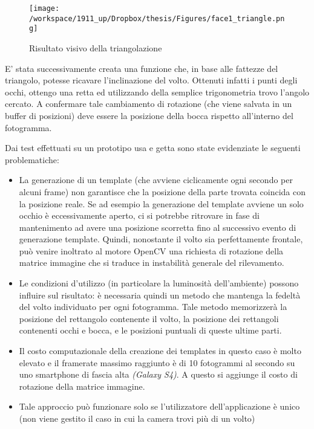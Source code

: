 \begin{figure}[H]\centering  
\texttt{[image: /workspace/1911\_up/Dropbox/thesis/Figures/face1\_triangle.png]}
\caption[Risultato visivo della triangolazione]{Risultato visivo della triangolazione}
\label{pic-a}
\end{figure}

E' stata successivamente creata una funzione che, in base alle fattezze del triangolo, potesse ricavare l'inclinazione del volto. Ottenuti infatti i punti degli occhi, ottengo una retta ed utilizzando della semplice trigonometria trovo l'angolo cercato. A confermare tale cambiamento di rotazione (che viene salvata in un buffer di posizioni) deve essere la posizione della bocca rispetto all'interno del fotogramma.

Dai test effettuati su un prototipo usa e getta sono state evidenziate le seguenti problematiche:

\begin{itemize}
\item La generazione di un template (che avviene ciclicamente ogni secondo per alcuni frame) non garantisce che la posizione della parte trovata coincida con la posizione reale. Se ad esempio la generazione del template avviene un solo occhio è eccessivamente aperto, ci si potrebbe ritrovare in fase di mantenimento ad avere una posizione scorretta fino al successivo evento di generazione template. Quindi, nonostante il volto sia perfettamente frontale, può venire inoltrato al motore OpenCV una richiesta di rotazione della matrice immagine che si traduce in instabilità generale del rilevamento.
\item Le condizioni d'utilizzo (in particolare la luminosità dell'ambiente) possono influire sul risultato: è necessaria quindi un metodo che mantenga la fedeltà del volto individuato per ogni fotogramma. Tale metodo memorizzerà la posizione del rettangolo contenente il volto, la posizione dei rettangoli contenenti occhi e bocca, e le posizioni puntuali di queste ultime parti.
\item Il costo computazionale della creazione dei templates in questo caso è molto elevato e il framerate massimo raggiunto è di 10 fotogrammi al secondo su uno smartphone di fascia alta \textit{(Galaxy S4)}. A questo si aggiunge il costo di rotazione della matrice immagine.
\item Tale approccio può funzionare solo se l'utilizzatore dell'applicazione è unico (non viene gestito il caso in cui la camera trovi più di un volto)
\end{itemize}			

